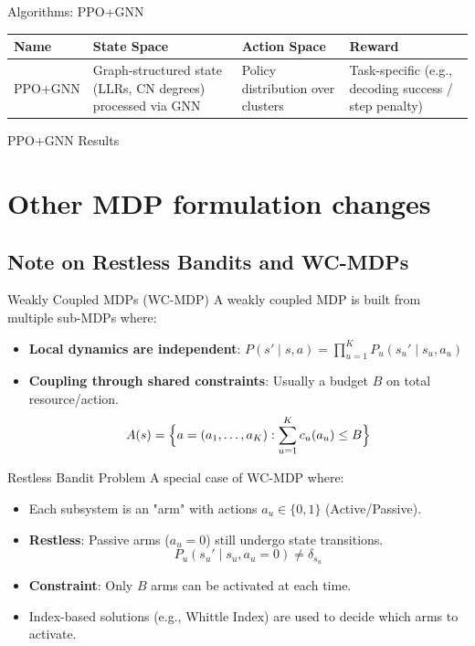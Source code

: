 \documentclass{beamer}
\begin{document}
\begin{frame}{Algorithms: PPO+GNN}
\begin{table}
\centering
\begin{tabularx}{\textwidth}{>{\raggedright\arraybackslash}p{2.5cm} X X X}
\toprule
\textbf{Name} & \textbf{State Space} & \textbf{Action Space} & \textbf{Reward} \\
\midrule
PPO+GNN & Graph-structured state (LLRs, CN degrees) processed via GNN & Policy distribution over clusters & Task-specific (e.g., decoding success / step penalty) \\
\bottomrule
\end{tabularx}
\end{table}
\end{frame}

\begin{frame}{PPO+GNN Results}
\end{frame}

\section{Other MDP formulation changes}

\subsection{Note on Restless Bandits and WC-MDPs}

\begin{frame}{Weakly Coupled MDPs (WC-MDP)}
A weakly coupled MDP is built from multiple sub-MDPs where:
\begin{itemize}
  \item \textbf{Local dynamics are independent}: $P(s'\mid s,a)=\prod_{u=1}^K P_u(s_u'\mid s_u,a_u)$
  \item \textbf{Coupling through shared constraints}: Usually a budget $B$ on total resource/action.
  \[
  A(s) = \Bigl\{a=(a_1,\dots,a_K): \sum_{u=1}^K c_u(a_u) \le B\Bigr\}
  \]
\end{itemize}
\end{frame}

\begin{frame}{Restless Bandit Problem}
A special case of WC-MDP where:
\begin{itemize}
  \item Each subsystem is an "arm" with actions $a_u \in \{0,1\}$ (Active/Passive).
  \item \textbf{Restless}: Passive arms ($a_u=0$) still undergo state transitions.
  \[
  P_u(s_u'\mid s_u, a_u=0) \neq \delta_{s_u}
  \]
  \item \textbf{Constraint}: Only $B$ arms can be activated at each time.
  \item Index-based solutions (e.g., Whittle Index) are used to decide which arms to activate.
\end{itemize}
\end{frame}
\end{document}
